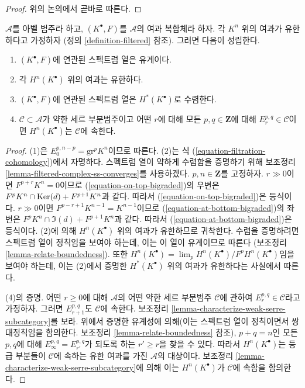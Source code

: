 \begin{proof}
위의 논의에서 곧바로 따른다.
\end{proof}

\begin{lemma}
\label{lemma-biregular-ss-converges}
$\mathcal{A}$를 아벨 범주라 하고, $(K^\bullet, F)$를 $\mathcal{A}$의
여과 복합체라 하자. 각 $K^n$ 위의 여과가 유한하다고 가정하자
(정의 \ref{definition-filtered} 참조). 그러면 다음이 성립한다.
\begin{enumerate}
\item $(K^\bullet, F)$에 연관된 스펙트럼 열은 유계이다.
\item 각 $H^n(K^\bullet)$ 위의 여과는 유한하다.
\item $(K^\bullet, F)$에 연관된 스펙트럼 열은
$H^*(K^\bullet)$로 수렴한다.
\item $\mathcal{C} \subset \mathcal{A}$가 약한 세르 부분범주이고 어떤
$r$에 대해 모든 $p, q \in \mathbf{Z}$에 대해
$E_r^{p, q} \in \mathcal{C}$이면 $H^n(K^\bullet)$는
$\mathcal{C}$에 속한다.
\end{enumerate}
\end{lemma}

\begin{proof}
(1)은 $E_0^{p, n - p} = \text{gr}^p K^n$이므로 따른다. (2)는 식
(\ref{equation-filtration-cohomology})에서 자명하다. 스펙트럼 열이
약하게 수렴함을 증명하기 위해 보조정리
\ref{lemma-filtered-complex-ss-converges}를 사용하겠다.
$p, n \in \mathbf{Z}$를 고정하자. $r \gg 0$이면
$F^{p + r}K^n = 0$이므로 (\ref{equation-on-top-bigraded})의 우변은
$F^pK^n \cap \mathop{\mathrm{Ker}}(d) + F^{p + 1}K^n$과 같다. 따라서
(\ref{equation-on-top-bigraded})은 등식이다. $r \gg 0$이면
$F^{p - r + 1}K^{n - 1} = K^{n - 1}$이므로
(\ref{equation-at-bottom-bigraded})의 좌변은
$F^pK^n \cap \Im(d) + F^{p + 1}K^n$과 같다. 따라서
(\ref{equation-at-bottom-bigraded})은 등식이다. (2)에 의해
$H^n(K^\bullet)$ 위의 여과가 유한하므로 귀착한다. 수렴을 증명하려면
스펙트럼 열이 정칙임을 보여야 하는데, 이는 이 열이 유계이므로 따른다
(보조정리 \ref{lemma-relate-boundedness}). 또한
$H^n(K^\bullet) = \lim_p H^n(K^\bullet)/F^pH^n(K^\bullet)$임을 보여야
하는데, 이는 (2)에서 증명한 $H^*(K^\bullet)$ 위의 여과가 유한하다는
사실에서 따른다.

\medskip\noindent
(4)의 증명. 어떤 $r \geq 0$에 대해 $\mathcal{A}$의 어떤 약한 세르
부분범주 $\mathcal{C}$에 관하여 $E_r^{p, q} \in \mathcal{C}$라고
가정하자.
그러면 $E_{r + 1}^{p, q}$도 $\mathcal{C}$에 속한다. 보조정리
\ref{lemma-characterize-weak-serre-subcategory}를 보라. 위에서 증명한
유계성에 의해(이는 스펙트럼 열이 정칙이면서 쌍대정칙임을 함의한다.
보조정리 \ref{lemma-relate-boundedness} 참조), $p + q = n$인 모든
$p, q$에 대해 $E_\infty^{p, q} = E_{r'}^{p, q}$가 되도록 하는
$r' \geq r$을 찾을 수 있다. 따라서 $H^n(K^\bullet)$는 등급 부분들이
$\mathcal{C}$에 속하는 유한 여과를 가진 $\mathcal{A}$의 대상이다.
보조정리 \ref{lemma-characterize-weak-serre-subcategory}에 의해 이는
$H^n(K^\bullet)$가 $\mathcal{C}$에 속함을 함의한다.
\end{proof}


